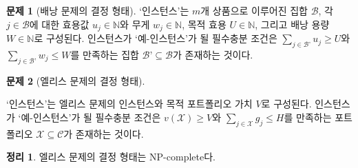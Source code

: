 \documentclass[11pt]{article} %
\newif\ifen
\newtheorem{theorem}{Theorem}
\theoremstyle{definition}
\newtheorem{problem}{Problem}
\newtheorem{theorem}{정리}
\theoremstyle{definition}
\newtheorem{problem}{문제}
\begin{document}
\begin{problem}[\ifen Decision form of knapsack problem\else 배낭 문제의 결정 형태\fi]
\ifen 
An \emph{instance} consists of a set $\mathcal{B}$ of $m$ objects, utility values $u_j \in \mathbb{N}$ and weight $w_j \in \mathbb{N}$ for each $j \in \mathcal{B}$, and target utility $U\in \mathbb{N}$ and knapsack capacity $W\in \mathbb{N}$. The instance is called a \emph{yes-instance} if and only if there exists a set $\mathcal{B’} \subseteq \mathcal{B}$ having $\sum_{j \in \mathcal{B’}} u_j \geq U$ and  $\sum_{j \in \mathcal{B’}} w_j \leq W$.
\else
`인스턴스'는 $m$개 상품으로 이루어진 집합 $\mathcal{B}$, 각 $j \in \mathcal{B}$에 대한 효용값 $u_j \in \mathbb{N}$와 무게 $w_j \in \mathbb{N}$, 목적 효용 $U\in \mathbb{N}$, 그리고 배낭 용량 $W\in \mathbb{N}$로 구성된다. 인스턴스가 `예-인스턴스'가 될 필수충분 조건은 $\sum_{j \in \mathcal{B’}} u_j \geq U$와  $\sum_{j \in \mathcal{B’}} w_j \leq W$를 만족하는 집합 $\mathcal{B’} \subseteq \mathcal{B}$가 존재하는 것이다.
\fi
\end{problem}

\begin{problem}[\ifen Decision form of Ellis's problem\else 엘리스 문제의 결정 형태\fi] \label{ellisdecisionform}
\ifen
An \emph{instance} consists of an instance of Ellis’s problem and a target valuation $V$. The instance is called a \emph{yes-instance} if and only if there exists a portfolio $\mathcal{X} \subseteq \mathcal{C}$ having $v(\mathcal{X}) \geq V$ and  $\sum_{j \in \mathcal{X}} g_j \leq H$.
\else
`인스턴스'는 엘리스 문제의 인스턴스와 목적 포트폴리오 가치 $V$로 구성된다. 인스턴스가 `예-인스턴스'가 될 필수충분 조건은 $v(\mathcal{X}) \geq V$와 $\sum_{j \in \mathcal{X}} g_j \leq H$를 만족하는 포트폴리오 $\mathcal{X} \subseteq \mathcal{C}$가 존재하는 것이다.
\fi
\end{problem}

\begin{theorem}
\ifen
The decision form of Ellis’s problem is NP-complete.
\else
엘리스 문제의 결정 형태는 NP-complete다.
\fi
\end{theorem}
\end{document}
